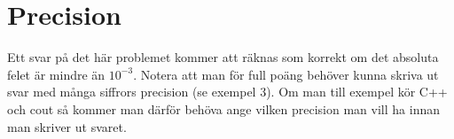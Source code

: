 \section*{Precision}
Ett svar på det här problemet kommer att räknas som korrekt om det absoluta felet är mindre än $10^{-3}$. Notera att man för full poäng behöver kunna skriva ut svar med många siffrors precision (se exempel 3). Om man till exempel kör C++ och cout så kommer man därför behöva ange vilken precision man vill ha innan man skriver ut svaret.

